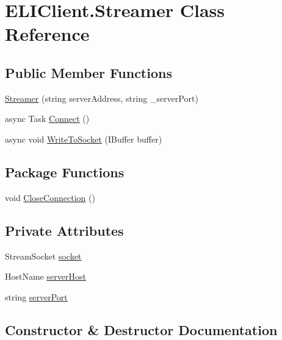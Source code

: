 \hypertarget{class_e_l_i_client_1_1_streamer}{}\section{E\+L\+I\+Client.\+Streamer Class Reference}
\label{class_e_l_i_client_1_1_streamer}
\subsection*{Public Member Functions}
\begin{DoxyCompactItemize}
\item 
\hyperlink{class_e_l_i_client_1_1_streamer_af385f8c92474d6dd8e62c7ac00b098a1}{Streamer} (string server\+Address, string \+\_\+server\+Port)
\item 
async Task \hyperlink{class_e_l_i_client_1_1_streamer_aee0823494f123fb1a8ad2ab136cf74f5}{Connect} ()
\item 
async void \hyperlink{class_e_l_i_client_1_1_streamer_af88e4f7491aa8ca6cfdc6de6786fd89c}{Write\+To\+Socket} (I\+Buffer buffer)
\end{DoxyCompactItemize}
\subsection*{Package Functions}
\begin{DoxyCompactItemize}
\item 
void \hyperlink{class_e_l_i_client_1_1_streamer_a7825ae64d0072b8241d29d356befe42c}{Close\+Connection} ()
\end{DoxyCompactItemize}
\subsection*{Private Attributes}
\begin{DoxyCompactItemize}
\item 
Stream\+Socket \hyperlink{class_e_l_i_client_1_1_streamer_a3f9f039a53e135e6545efe8e336d23a6}{socket}
\item 
Host\+Name \hyperlink{class_e_l_i_client_1_1_streamer_aa8d1d426ed5fb8218b9dbdfd7d43b07f}{server\+Host}
\item 
string \hyperlink{class_e_l_i_client_1_1_streamer_ae6c3da0a3fb272c0a50260e4049659f0}{server\+Port}
\end{DoxyCompactItemize}


\subsection{Constructor \& Destructor Documentation}
\mbox{\label{class_e_l_i_client_1_1_streamer_af385f8c92474d6dd8e62c7ac00b098a1}} 
